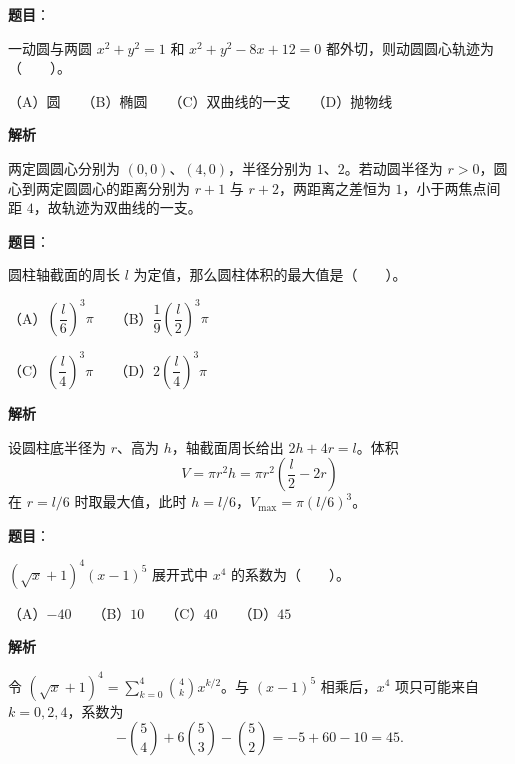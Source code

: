 \begin{answer}

\textbf{题目}：

一动圆与两圆 $x^2+y^2=1$ 和 $x^2+y^2-8x+12=0$ 都外切，则动圆圆心轨迹为\mbox{（　　）}。

（A）圆　　（B）椭圆　　（C）双曲线的一支　　（D）抛物线

\textbf{解析}

两定圆圆心分别为 $(0,0)$、$(4,0)$，半径分别为 $1$、$2$。若动圆半径为 $r>0$，圆心到两定圆圆心的距离分别为 $r+1$ 与 $r+2$，两距离之差恒为 $1$，小于两焦点间距 $4$，故轨迹为双曲线的一支。


\end{answer}
\begin{answer}

\textbf{题目}：

圆柱轴截面的周长 $l$ 为定值，那么圆柱体积的最大值是\mbox{（　　）}。

（A）$\left(\dfrac l6\right)^3\pi$　　（B）$\dfrac19\left(\dfrac l2\right)^3\pi$

（C）$\left(\dfrac l4\right)^3\pi$　　（D）$2\left(\dfrac l4\right)^3\pi$

\textbf{解析}

设圆柱底半径为 $r$、高为 $h$，轴截面周长给出 $2h+4r=l$。体积
\nopagebreak[4]
\[
V=\pi r^2h=\pi r^2\left(\frac l2-2r\right)
\]
在 $r=l/6$ 时取最大值，此时 $h=l/6$，$V_{\max}=\pi(l/6)^3$。


\end{answer}
\begin{answer}

\textbf{题目}：

$(\sqrt{x}+1)^4(x-1)^5$ 展开式中 $x^4$ 的系数为\mbox{（　　）}。

（A）$-40$　　（B）$10$　　（C）$40$　　（D）$45$

\textbf{解析}

 令 $(\sqrt{x}+1)^4=\sum_{k=0}^4\binom4k x^{k/2}$。与 $(x-1)^5$ 相乘后，$x^4$ 项只可能来自 $k=0,2,4$，系数为
\nopagebreak[4]
\[
-\binom54+6\binom53-\binom52=-5+60-10=45.
\]


\end{answer}
